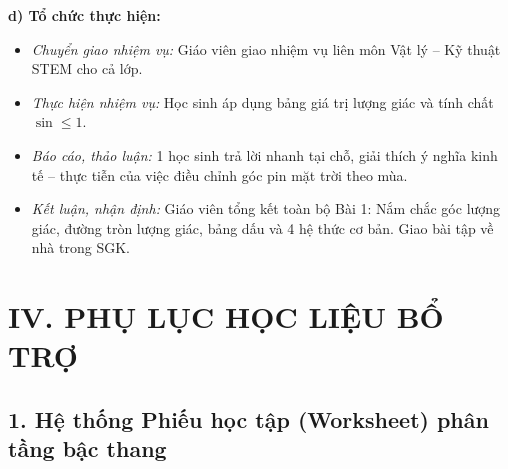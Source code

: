 \documentclass[12pt, a4paper]{article}
\begin{document}
\textbf{d) Tổ chức thực hiện:}
\begin{itemize}[leftmargin=0.6cm]
    \item \textit{Chuyển giao nhiệm vụ:} Giáo viên giao nhiệm vụ liên môn Vật lý -- Kỹ thuật STEM cho cả lớp.
    \item \textit{Thực hiện nhiệm vụ:} Học sinh áp dụng bảng giá trị lượng giác và tính chất $\sin \le 1$.
    \item \textit{Báo cáo, thảo luận:} 1 học sinh trả lời nhanh tại chỗ, giải thích ý nghĩa kinh tế -- thực tiễn của việc điều chỉnh góc pin mặt trời theo mùa.
    \item \textit{Kết luận, nhận định:} Giáo viên tổng kết toàn bộ Bài 1: Nắm chắc góc lượng giác, đường tròn lượng giác, bảng dấu và 4 hệ thức cơ bản. Giao bài tập về nhà trong SGK.
\end{itemize}

\newpage
\section*{IV. PHỤ LỤC HỌC LIỆU BỔ TRỢ}

\subsection*{1. Hệ thống Phiếu học tập (Worksheet) phân tầng bậc thang}
\end{document}
